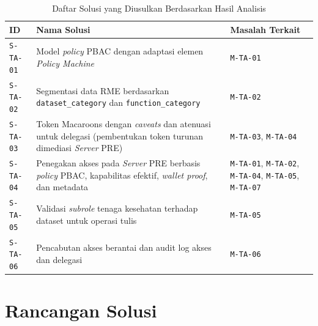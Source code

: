 \documentclass[bahasa, 12pt, a4paper, onecolumn, oneside, final]{report}
\begin{document}
\begin{table}[!ht]
	\centering
	\caption{Daftar Solusi yang Diusulkan Berdasarkan Hasil Analisis}
	\label{tab:daftar-solusi-ta}
	\small
	\begin{tabular}{|p{}|p{}|p{}|}
		\hline
		\textbf{ID}      & \textbf{Nama Solusi}                                                                                                             & \textbf{Masalah Terkait}                                                                 \\ \hline
		\texttt{S-TA-01} & Model \textit{policy} PBAC dengan adaptasi elemen \textit{Policy Machine}                                                        & \texttt{M-TA-01}                                                                         \\ \hline
		\texttt{S-TA-02} & Segmentasi data RME berdasarkan \texttt{dataset\_category} dan \texttt{function\_category}                                       & \texttt{M-TA-02}                                                                         \\ \hline
		\texttt{S-TA-03} & Token Macaroons dengan \textit{caveats} dan atenuasi untuk delegasi (pembentukan token turunan dimediasi \textit{Server} PRE)    & \texttt{M-TA-03}, \texttt{M-TA-04}                                                       \\ \hline
		\texttt{S-TA-04} & Penegakan akses pada \textit{Server} PRE berbasis \textit{policy} PBAC, kapabilitas efektif, \textit{wallet proof}, dan metadata & \texttt{M-TA-01}, \texttt{M-TA-02}, \texttt{M-TA-04}, \texttt{M-TA-05}, \texttt{M-TA-07} \\ \hline
		\texttt{S-TA-05} & Validasi \textit{subrole} tenaga kesehatan terhadap dataset untuk operasi tulis                                                  & \texttt{M-TA-05}                                                                         \\ \hline
		\texttt{S-TA-06} & Pencabutan akses berantai dan audit log akses dan delegasi                                                                       & \texttt{M-TA-06}                                                                         \\ \hline
	\end{tabular}
\end{table}

%

\section{Rancangan Solusi}
\label{sec:rancangan-solusi}
\end{document}
